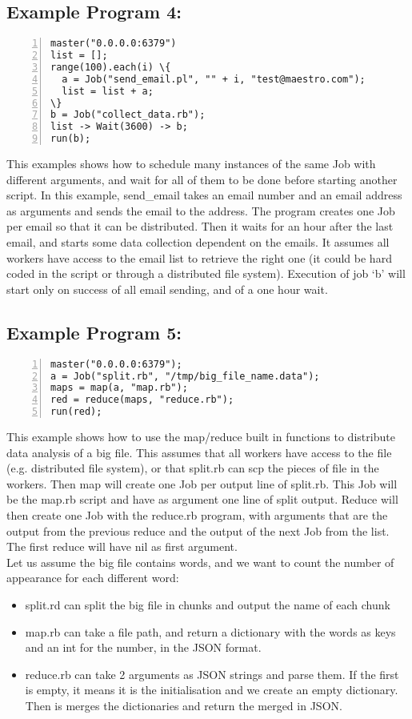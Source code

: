\subsection*{Example Program 4:}
\begin{Verbatim}[numbers=left,commandchars=\\\{\}]
master("0.0.0.0:6379")
list = [];
range(100).each(i) \{
  a = Job("send_email.pl", "" + i, "test@maestro.com");
  list = list + a;
\}
b = Job("collect_data.rb");
list -> Wait(3600) -> b;
run(b);
\end{Verbatim}

This examples shows how to schedule many instances of the same Job with different
arguments, and wait for all of them to be done before starting another script.
In this example, send\_email takes an email number and an email address as arguments
and sends the email to the address. The program creates one Job per email so that it
can be distributed. Then it waits for an hour after the last email, and starts some data
collection dependent on the emails. It assumes all workers have access to the email list
to retrieve the right one (it could be hard coded in the script or through a distributed
file system).
Execution of job `b' will start only on success of all email sending,
and of a one hour wait.

\subsection*{Example Program 5:}
\begin{Verbatim}[numbers=left,commandchars=\\\{\}]
master("0.0.0.0:6379");
a = Job("split.rb", "/tmp/big_file_name.data");
maps = map(a, "map.rb");
red = reduce(maps, "reduce.rb");
run(red);
\end{Verbatim}

This example shows how to use the map/reduce built in functions to distribute data
analysis of a big file. This assumes that all workers have access to the file (e.g.
distributed file system), or that split.rb can scp the pieces of file in the workers.
Then map will create one Job per output line of split.rb. This Job will be the map.rb
script and have as argument one line of split output. Reduce will then create one Job
with the reduce.rb program, with arguments that are the output from the previous reduce and
the output of the next Job from the list. The first reduce will have nil as first argument.\\
Let us assume the big file contains words, and we want to count the number of appearance for
each different word:
\begin{itemize}
  \item split.rd can split the big file in chunks and output the name of each chunk
  \item map.rb can take a file path, and return a dictionary with the words as keys
    and an int for the number, in the JSON format.
  \item reduce.rb can take 2 arguments as JSON strings and parse them. If the first is
    empty, it means it is the initialisation and we create an empty dictionary. Then is
    merges the dictionaries and return the merged in JSON.
\end{itemize}

